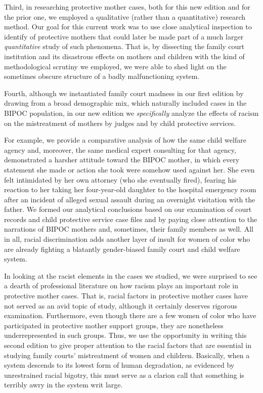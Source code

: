 Third, in researching protective mother cases, both for this new 
edition and for the prior one, we employed a qualitative (rather than a
quantitative) research method. Our goal for this current work was to
use close analytical inspection to identify  of
protective mothers that could later be made part of a much larger 
\textit{quantitative} study of such phenomena. That is, by dissecting the family court
institution and its disastrous effects on mothers and children with the
kind of methodological scrutiny we employed, we were able to shed light
on the sometimes obscure structure of a badly malfunctioning system. \pfl{}

Fourth, although we instantiated family court madness in our first
edition by drawing from a broad demographic mix, which naturally 
included cases in the BIPOC population, in our new edition we \textit{specifically}
analyze the effects of racism on the mistreatment of mothers by judges
and by child protective services. \pfl{}

For example, we provide a comparative analysis of how the same child
welfare agency and, moreover, the same medical expert consulting for
that agency, demonstrated a harsher attitude toward the BIPOC mother,
in which every statement she made or action she took were somehow
used against her. She even felt intimidated by her own attorney (who
she eventually fired), fearing his reaction to her taking her four-year-old
daughter to the hospital emergency room after an incident of alleged
sexual assault during an overnight visitation with the father. We formed
our analytical conclusions based on our examination of court records
and child protective service case files and by paying close attention to
the narrations of BIPOC mothers and, sometimes, their family members
as well. All in all, racial discrimination adds another layer of insult
for women of color who are already fighting a blatantly gender-biased
family court and child welfare system. \pfl{}

In looking at the racist elements in the cases we studied, we were surprised to see a dearth of professional literature on how racism plays
an important role in protective mother cases. That is, racial factors in
protective mother cases have not served as an avid topic of study, although it certainly deserves rigorous examination. Furthermore, even
though there are a few women of color who have participated in protective mother support groups, they are nonetheless underrepresented
in such groups. Thus, we use the opportunity in writing this second
edition to give proper attention to the racial factors that are essential in studying family courts' mistreatment of women and children.
Basically, when a system descends to its lowest form of human degradation, as evidenced by unrestrained racial bigotry, this must serve
as a clarion call that something is terribly awry in the system writ
large. \pfl{}

